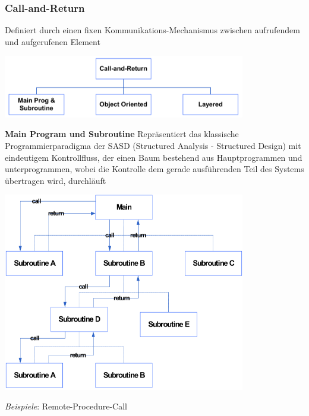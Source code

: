 \documentclass{report}
\newenvironment{Figure}
	{\par\medskip\noindent\minipage{\linewidth}}
	{\endminipage\par\medskip}
\theoremstyle{definition}
\theoremstyle{example}
\begin{document}
\subsubsection{Call-and-Return}
Definiert durch einen fixen Kommunikations-Mechanismus zwischen aufrufendem und aufgerufenen Element

\begin{Figure}
\centering
\includegraphics[width=400px]{img/CallAndReturn.png}
	\label{fig:Übersicht Call and Return}
\end{Figure}

\textbf{Main Program und Subroutine}
Repräsentiert das klassische Programmierparadigma der SASD (Structured Analysis - Structured Design) mit eindeutigem Kontrollfluss, der einen Baum bestehend aus Hauptprogrammen und unterprogrammen, wobei die Kontrolle dem gerade ausführenden Teil des Systems übertragen wird, durchläuft
\begin{Figure}
\centering
\includegraphics[width=400px]{img/MainProgramAndSubroutine.png}
	\label{fig:Ablauf MainProgram and subroutine}
\end{Figure}

\textit{Beispiele}: Remote-Procedure-Call\\
\end{document}
